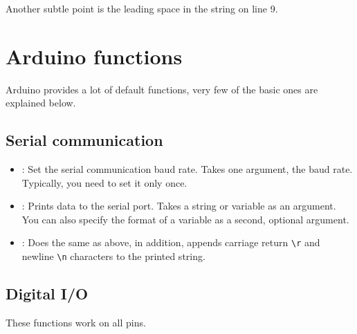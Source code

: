 \documentclass{article}
\begin{document}
			Another subtle point is the leading space in the string on line 9.

\section{Arduino functions}

	Arduino provides a lot of default functions, very few of the basic ones are explained below.

	\subsection{Serial communication}

		\begin{itemize}

			\item {}: Set the serial communication baud rate. Takes one argument, the baud rate. Typically, you need to set it only once.

			\item {}: Prints data to the serial port. Takes a string or variable as an argument. You can also specify the format of a variable as a second, optional argument.

			\item {}: Does the same as above, in addition, appends carriage return \texttt{\textbackslash{}r} and newline \texttt{\textbackslash{}n} characters to the printed string.

		\end{itemize}

	\subsection{Digital I/O}

		These functions work on all pins.
\end{document}
